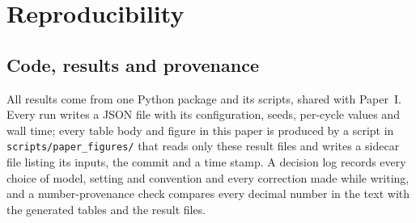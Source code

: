 \section{Reproducibility}
\label{app:reproducibility}

\subsection{Code, results and provenance}

All results come from one Python package and its scripts, shared with
Paper~I. Every run writes a JSON file with its configuration, seeds,
per-cycle values and wall time; every table body and figure in this paper
is produced by a script in \texttt{scripts/paper\_figures/} that reads only
these result files and writes a sidecar file listing its inputs, the commit
and a time stamp. A decision log records every choice of model, setting and
convention and every correction made while writing, and a
number-provenance check compares every decimal number in the text with the
generated tables and the result files.

